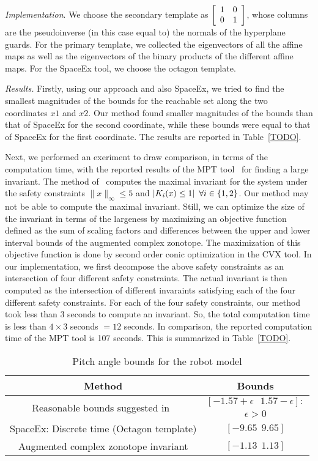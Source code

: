 \emph{Implementation}.  We choose the secondary template as
$\left[\begin{array}{ll}1 & 0\\0 & 1\end{array}\right]$, whose columns are
the pseudoinverse (in this case equal to) the normals of the
hyperplane guards.  For the primary template, we collected the
eigenvectors of all the affine maps as well as the eigenvectors of the
binary products of the different affine maps. For the SpaceEx tool, we
choose the octagon template.

\emph{Results.}  Firstly, using our approach and also SpaceEx, we
tried to find the smallest magnitudes of the bounds for the reachable
set along the two coordinates $x1$ and $x2$.  Our method found smaller
magnitudes of the bounds than that of SpaceEx for the second
coordinate, while these bounds were equal to that of SpaceEx for the
first coordinate.  The results are reported in Table~\ref{TODO}.

Next, we performed an exeriment to draw comparison, in terms of the
computation time, with the reported results of the MPT
tool~\cite{TODO} for finding a large invariant.  The method
of~\cite{TODO} computes the maximal invariant for the system under the
safety constraints $\|x\|_{\infty}\leq 5$ and $\left|K_i(x)\leq
1\right|~\forall i\in\left\{1,2\right\}$.  Our method may not be able to
compute the maximal invariant.  Still, we can optimize the size of the
invariant in terms of the largeness by maximizing an objective function
defined as the sum of scaling factors and differences between the
upper and lower interval bounds of the augmented complex zonotope.
The maximization of this objective function is done by second order
conic optimization in the CVX tool.  In our implementation, we first
decompose the above safety constraints as an intersection of four
different safety constraints.  The actual invariant is then computed
as the intersection of different invaraints satisfying each of the
four different safety constraints.  For each of the four safety
constraints, our method took less than $3$ seconds to compute an
invariant.  So, the total computation time is less than $4\times 3$
seconds $=12$ seconds.  In comparison, the reported computation time
of the MPT tool is 107 seconds.  This is summarized in
Table~\ref{TODO}.

\begin{table}
\caption{Pitch angle bounds for the robot model}
\centering
\begin{tabular}{|c|c|}
\hline
Method & Bounds\\
\hline
\multirow{2}{9.8em}{Reasonable bounds suggested in~\cite{TODO}} &
$[-1.57+\epsilon~~~1.57-\epsilon]:$\\
& $\epsilon>0$\\
\hline
\multirow{2}{9.8em}{SpaceEx: Discrete time (Octagon template)} &
\multirow{2}{*}{$[-9.65~~9.65]$}\\
& \\
\hline
\multirow{2}{9.8em}{Augmented complex zonotope invariant}
&  \multirow{2}{*}{$[-1.13~~1.13]$}\\
& \\
\hline
\end{tabular}
\end{table}


